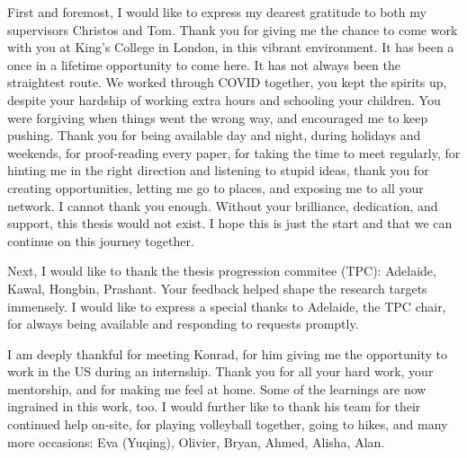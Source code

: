 First and foremost, I would like to express my dearest gratitude to both my supervisors Christos and Tom. Thank you for giving me the chance to come work with you at King's College in London, in this vibrant environment. It has been a once in a lifetime opportunity to come here. It has not always been the straightest route. We worked through COVID together, you kept the spirits up, despite your hardship of working extra hours and schooling your children. You were forgiving when things went the wrong way, and encouraged me to keep pushing. Thank you for being available day and night, during holidays and weekends, for proof-reading every paper, for taking the time to meet regularly, for hinting me in the right direction and listening to stupid ideas, thank you for creating opportunities, letting me go to places, and exposing me to all your network. I cannot thank you enough. Without your brilliance, dedication, and support, this thesis would not exist. I hope this is just the start and that we can continue on this journey together.

Next, I would like to thank the thesis progression commitee (TPC): Adelaide, Kawal, Hongbin, Prashant.  Your feedback helped shape the research targets immensely. I would like to express a special thanks to Adelaide, the TPC chair, for always being available and responding to requests promptly.










I am deeply thankful for meeting Konrad, for him giving me the opportunity to work in the US during an internship. Thank you for all your hard work, your mentorship, and for making me feel at home. Some of the learnings are now ingrained in this work, too. I would further like to thank his team for their continued help on-site, for playing volleyball together, going to hikes, and many more occasions: Eva (Yuqing), Olivier, Bryan, Ahmed, Alisha, Alan.

